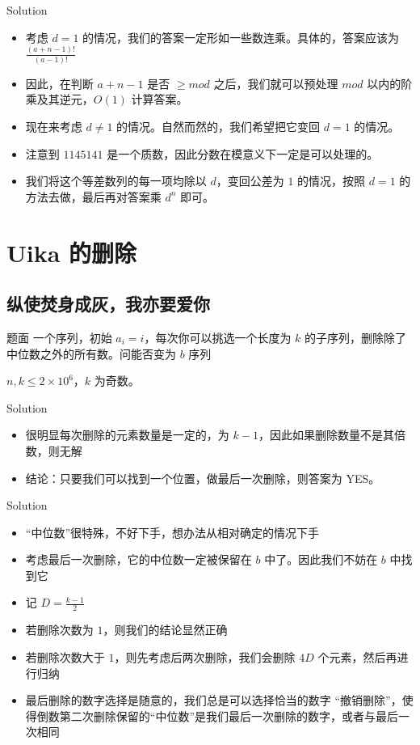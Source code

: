 ﻿\documentclass[aspectratio=169]{ctexbeamer}
\begin{document}
\begin{frame}{Solution}
    \begin{itemize}
        \item 考虑 $d=1$ 的情况，我们的答案一定形如一些数连乘。具体的，答案应该为 $\frac{(a+n-1)!}{(a-1)!}$
        \item 因此，在判断 $a+n-1$ 是否 $\ge mod$ 之后，我们就可以预处理 $mod$ 以内的阶乘及其逆元，$O(1)$ 计算答案。
        \item 现在来考虑 $d\neq 1$ 的情况。自然而然的，我们希望把它变回 $d=1$ 的情况。
        \item 注意到 $1145141$ 是一个质数，因此分数在模意义下一定是可以处理的。
        \item 我们将这个等差数列的每一项均除以 $d$，变回公差为 $ 1 $ 的情况，按照 $d=1$ 的方法去做，最后再对答案乘 $d^n$ 即可。
    \end{itemize}
\end{frame}

\section{Uika 的删除}
\subsection{纵使焚身成灰，我亦要爱你}
\begin{frame}{题面}
    一个序列，初始 $a_i=i$，每次你可以挑选一个长度为 $k$ 的子序列，删除除了中位数之外的所有数。问能否变为 $b$ 序列

    $n,k\le 2\times 10^6$，$k$ 为奇数。
\end{frame}

\begin{frame}{Solution}
    \begin{itemize}
        \item 很明显每次删除的元素数量是一定的，为 $k-1$，因此如果删除数量不是其倍数，则无解
        \item 结论：只要我们可以找到一个位置，做最后一次删除，则答案为 YES。
    \end{itemize}
\end{frame}

\begin{frame}{Solution}
    \begin{itemize}
        \item “中位数”很特殊，不好下手，想办法从相对确定的情况下手
        \item 考虑最后一次删除，它的中位数一定被保留在 $b$ 中了。因此我们不妨在 $b$ 中找到它
        \item 记 $D=\frac{k-1}{2}$
        \item 若删除次数为 $ 1 $，则我们的结论显然正确
        \item 若删除次数大于 $ 1 $，则先考虑后两次删除，我们会删除 $4D$ 个元素，然后再进行归纳
        \item 最后删除的数字选择是随意的，我们总是可以选择恰当的数字 “撤销删除”，使得倒数第二次删除保留的“中位数”是我们最后一次删除的数字，或者与最后一次相同
    \end{itemize}
\end{frame}
\end{document}
